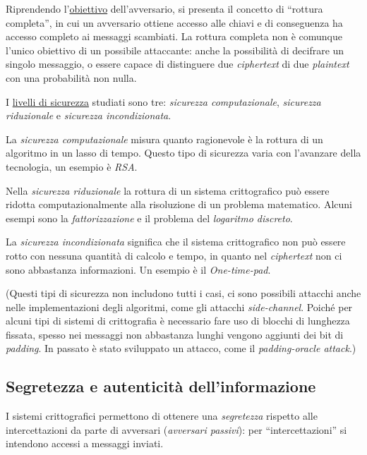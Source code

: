\vspace{1em} \noindent
Riprendendo l'\underline{obiettivo} dell'avversario, si presenta il concetto di ``rottura completa'', in cui un avversario ottiene accesso alle chiavi e di conseguenza ha accesso completo ai messaggi scambiati. La rottura completa non è comunque l'unico obiettivo di un possibile attaccante: anche la possibilità di decifrare un singolo messaggio, o essere capace di distinguere due \emph{ciphertext} di due \emph{plaintext} con una probabilità non nulla.


\vspace{1em}\noindent
I \underline{livelli di sicurezza} studiati sono tre: \emph{sicurezza computazionale}, \emph{sicurezza riduzionale} e \emph{sicurezza incondizionata}.

La \emph{sicurezza computazionale} misura quanto ragionevole è la rottura di un algoritmo in un lasso di tempo. Questo tipo di sicurezza varia con l'avanzare della tecnologia, un esempio è \emph{RSA}.

Nella \emph{sicurezza riduzionale} la rottura di un sistema crittografico può essere ridotta computazionalmente alla risoluzione di un problema matematico. Alcuni esempi sono la \emph{fattorizzazione} e il problema del \emph{logaritmo discreto}. 

La \emph{sicurezza incondizionata} significa che il sistema crittografico non può essere rotto con nessuna quantità di calcolo e tempo, in quanto nel \emph{ciphertext} non ci sono abbastanza informazioni. Un esempio è il \emph{One-time-pad}.

\vspace{1em}\noindent (Questi tipi di sicurezza non includono tutti i casi, ci sono possibili attacchi anche nelle implementazioni degli algoritmi, come gli attacchi \emph{side-channel}. Poiché per alcuni tipi di sistemi di crittografia è necessario fare uso di blocchi di lunghezza fissata, spesso nei messaggi non abbastanza lunghi vengono aggiunti dei bit di \emph{padding}. In passato è stato sviluppato un attacco, come il \emph{padding-oracle attack}.)

\subsection{Segretezza e autenticità dell'informazione}
I sistemi crittografici permettono di ottenere una \emph{segretezza} rispetto alle intercettazioni da parte di avversari (\emph{avversari passivi}): per ``intercettazioni'' si intendono accessi a messaggi inviati. 

